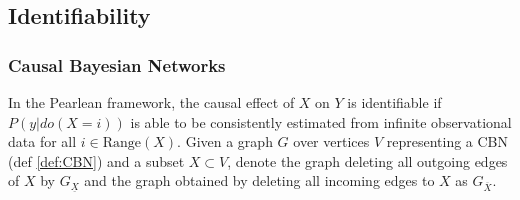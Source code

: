 


\subsection{Identifiability}

\subsubsection{Causal Bayesian Networks}

In the Pearlean framework, the causal effect of $X$ on $Y$ is identifiable if $P(y|do(X=i))$ is able to be consistently estimated from infinite observational data for all $i\in \mathrm{Range}(X)$. Given a graph $G$ over vertices $V$ representing a CBN (def \ref{def:CBN}) and a subset $X\subset V$, denote the graph deleting all outgoing edges of $X$ by $G_{\underline{X}}$ and the graph obtained by deleting all incoming edges to $X$ as $G_{\overline{X}}$.

